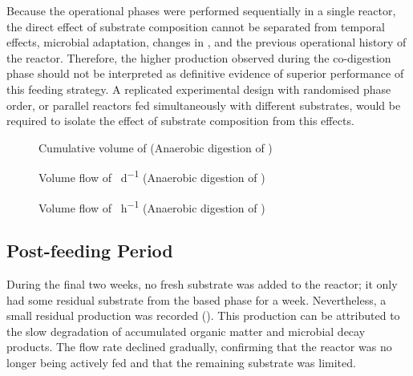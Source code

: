 \documentclass[12pt, a4paper, oneside]{report}
\begin{document}
Because the operational phases were performed sequentially in a single reactor, the direct effect of substrate composition cannot be separated from temporal effects, microbial adaptation, changes in , and the previous operational history of the reactor. Therefore, the higher  production observed during the co-digestion phase should not be interpreted as definitive evidence of superior performance of this feeding strategy. A replicated experimental design with randomised phase order, or parallel reactors fed simultaneously with different substrates, would be required to isolate the effect of substrate composition from this effects.

\begin{figure}[H]
    \centering
    \caption{Cumulative volume of  \unit{\nml} (Anaerobic digestion of )}
    \label{graph:gl-accumulation}
\end{figure}

\begin{figure}[H]
    \centering
    \caption{Volume flow of  \unit{\nml\per\day} (Anaerobic digestion of )}
    \label{graph:gl-flow}
\end{figure}

\begin{figure}[H]
    \centering
    \caption{Volume flow of  \unit{\nml\per\hour} (Anaerobic digestion of )}
    \label{graph:gl-flow-30}
\end{figure}

\subsection{Post-feeding Period}
\label{subsec:post_feeding}

During the final two weeks, no fresh substrate was added to the reactor; it only had some residual substrate from the  based phase for a week. Nevertheless, a small residual  production was recorded (). This production can be attributed to the slow degradation of accumulated organic matter and microbial decay products. The flow rate declined gradually, confirming that the reactor was no longer being actively fed and that the remaining substrate was limited.
\end{document}
